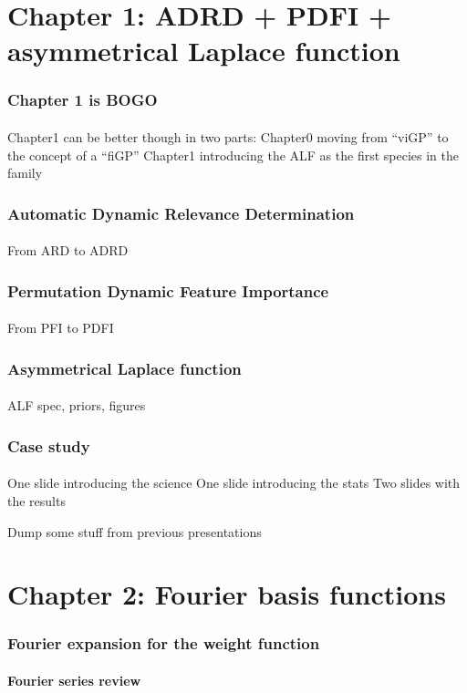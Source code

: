 \documentclass{snedecorbeamer}
\begin{document}
\section{Chapter 1: ADRD + PDFI + asymmetrical Laplace function}

\begin{frame}
  \frametitle{Chapter 1 is BOGO}
  \framesubtitle{}

  Chapter1 can be better though in two parts:
  Chapter0 moving from ``viGP'' to the concept of a ``fiGP''
  Chapter1 introducing the ALF as the first species in the family
\end{frame}

\begin{frame}
  \frametitle{Automatic Dynamic Relevance Determination}
  \framesubtitle{}

  From ARD to ADRD
\end{frame}

\begin{frame}
  \frametitle{Permutation Dynamic Feature Importance}
  \framesubtitle{}

  From PFI to PDFI
\end{frame}

\begin{frame}
  \frametitle{Asymmetrical Laplace function}
  \framesubtitle{}

  ALF spec, priors, figures
\end{frame}

\begin{frame}
  \frametitle{Case study}
  \framesubtitle{}

  One slide introducing the science
  One slide introducing the stats
  Two slides with the results
\end{frame}

\begin{frame}
  Dump some stuff from previous presentations

\end{frame}

\section{Chapter 2: Fourier basis functions}

\begin{frame}
  \frametitle{Fourier expansion for the weight function}
  \framesubtitle{Fourier series review}

\end{frame}
\end{document}

